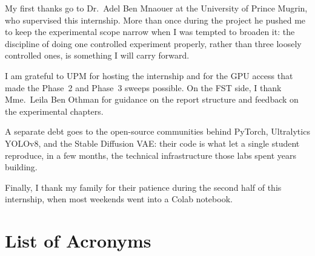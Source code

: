 \documentclass[12pt,a4paper]{report}
\begin{document}
My first thanks go to Dr.~Adel Ben Mnaouer at the University of Prince Mugrin, who supervised this internship. More than once during the project he pushed me to keep the experimental scope narrow when I was tempted to broaden it: the discipline of doing one controlled experiment properly, rather than three loosely controlled ones, is something I will carry forward.

I am grateful to UPM for hosting the internship and for the GPU access that made the Phase~2 and Phase~3 sweeps possible. On the FST side, I thank Mme.~Leila Ben Othman for guidance on the report structure and feedback on the experimental chapters.

A separate debt goes to the open-source communities behind PyTorch, Ultralytics YOLOv8, and the Stable Diffusion VAE: their code is what let a single student reproduce, in a few months, the technical infrastructure those labs spent years building.

Finally, I thank my family for their patience during the second half of this internship, when most weekends went into a Colab notebook.

\tableofcontents
\listoffigures      %
\listoftables       %

\clearpage
\chapter*{List of Acronyms}
\end{document}
